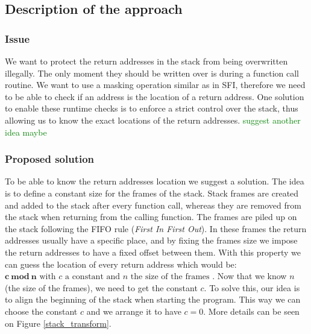 \documentclass[11pt]{sdm}
\begin{document}
\subsection{Description of the approach}
\label{sub:Description of the approach}

\subsubsection{Issue}
\label{ssub:Issue}

	We want to protect the return addresses in the stack from being overwritten illegally. The only moment they should be written over is during a function call routine.
We want to use a masking operation similar as in SFI, therefore we need to be able to check if an address is the location of a return address. One solution to enable these runtime checks is to enforce a strict control over the stack, thus allowing us to know the exact locations of the return addresses.
\textcolor{green}{suggest another idea maybe}

\subsubsection{Proposed solution}
\label{ssub:Proposed solution}

	To be able to know the return addresses location we suggest a solution.
The idea is to define a constant size for the frames of the stack. Stack frames are created and added to the stack after every function call, whereas they are removed from the stack when returning from the calling function. The frames are piled up on the stack following the FIFO rule (\textit{First In First Out}).
In these frames the return addresses usually have a specific place, and by fixing the frames size we impose the return addresses to have a fixed offset between them.
With this property we can guess the location of every return address which would be: $ \mathbf{c~mod~n} \text{     with } c \text{ a constant and } n \text{ the size of the frames }$.
Now that we know $n$ (the size of the frames), we need to get the constant $c$. To solve this, our idea is to align the beginning of the stack when starting the program. This way we can choose the constant $c$ and we arrange it to have $c=0$.
More details can be seen on Figure \ref{stack_transform}.
\end{document}
